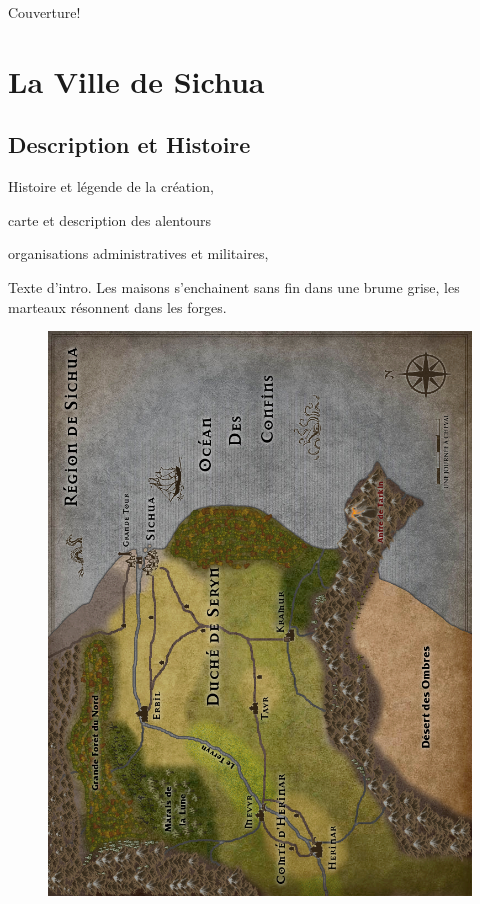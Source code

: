 \documentclass{dd}
\begin{document}
Couverture!

\clearpage

\tableofcontents

\part{La Ville de Sichua}

\chapter{Description et Histoire}

Histoire et légende de la création, 

carte et description des alentours

organisations administratives et militaires, 

Texte d'intro.
Les maisons s'enchainent sans fin dans une brume grise, les marteaux résonnent
dans les forges. 

\begin{figure}[p]
\includegraphics[width=17.5cm]{Maps/RegionL.jpg}
\end{figure}
\end{document}
